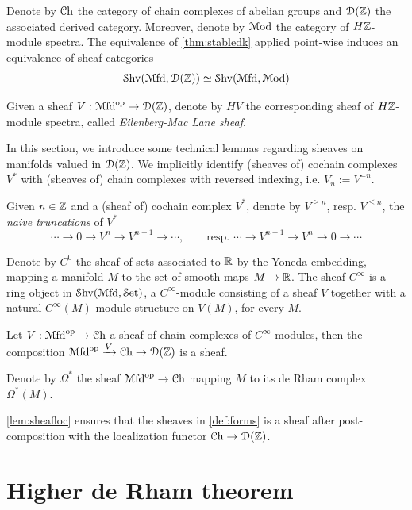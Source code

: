 \documentclass[10pt]{amsart}
\begin{document}
Denote by $\mathcal{C}\mathrm{h}$ the category of chain complexes of abelian groups and $\mathcal{D}(\mathbb{Z})$ the associated derived category. Moreover, denote by $\mathcal{M}\mathrm{od}$ the category of $H\mathbb{Z}$-module spectra. The equivalence of \cref{thm:stabledk} applied point-wise induces an equivalence of sheaf categories
\[\mathcal{S}\mathrm{hv}(\mathcal{M}\mathrm{fd},\mathcal{D}(\mathbb{Z}))\simeq\mathcal{S}\mathrm{hv}(\mathcal{M}\mathrm{fd},\mathcal{M}\mathrm{od})\] 
\begin{definition}\label{def:EMsheaf}
  Given a sheaf $V:\mathcal{M}\mathrm{fd}^{\mathrm{op}}\to\mathcal{D}(\mathbb{Z})$, denote by $HV$ the corresponding sheaf of $H\mathbb{Z}$-module spectra, called \emph{Eilenberg-Mac Lane sheaf}. 
\end{definition}
In this section, we introduce some technical lemmas regarding sheaves on manifolds valued in $\mathcal{D}(\mathbb{Z})$. We implicitly identify (sheaves of) cochain complexes $V^*$ with (sheaves of) chain complexes with reversed indexing, i.e. $V_n:=V^{-n}$.
\begin{definition}Given $n\in\mathbb{Z}$ and a (sheaf of) cochain complex $V^*$, denote by $V^{\geq n}$, resp. $V^{\leq n}$, the \emph{naive truncations} of $V^*$ \[\cdots\to0\to V^n\to V^{n+1}\to\cdots, \qquad \mbox{resp. }\cdots\to V^{n-1}\to V^n\to0\to\cdots\]
\end{definition}
Denote by $C^0$ the sheaf of {sets} associated to $\mathbb{R}$ by the Yoneda embedding, mapping a manifold $M$ to the set of smooth maps $M\to\mathbb{R}$. The sheaf $C^\infty$ is a ring object in $\mathcal{S}\mathrm{hv}(\mathcal{M}\mathrm{fd},\mathcal{S}\mathrm{et})$, a $C^\infty$-module consisting of a sheaf $V$ together with a natural $C^\infty(M)$-module structure on $V(M)$, for every $M$.
\begin{lemma}\label{lem:sheafloc}
  Let $V:\mathcal{M}\mathrm{fd}^{\mathrm{op}}\to\mathcal{C}\mathrm{h}$ a sheaf of chain complexes of $C^\infty$-modules, then the composition $\mathcal{M}\mathrm{fd}^{\mathrm{op}}\xrightarrow{V}\mathcal{C}\mathrm{h}\to\mathcal{D}(\mathbb{Z})$ is a sheaf. 
\end{lemma}
\begin{definition}\label{def:forms}
  Denote by $\Omega^*$ the sheaf $\mathcal{M}\mathrm{fd}^{\mathrm{op}}\to\mathcal{C}\mathrm{h}$ mapping $M$ to its de Rham complex $\Omega^*(M)$. 
\end{definition}
\cref{lem:sheafloc} ensures that the sheaves in \cref{def:forms} is a sheaf after post-composition with the localization functor $\mathcal{C}\mathrm{h}\to\mathcal{D}(\mathbb{Z})$. 

\section{Higher de Rham theorem}
\end{document}
